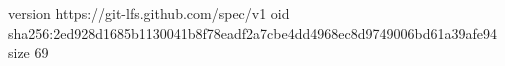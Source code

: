 version https://git-lfs.github.com/spec/v1
oid sha256:2ed928d1685b1130041b8f78eadf2a7cbe4dd4968ec8d9749006bd61a39afe94
size 69
